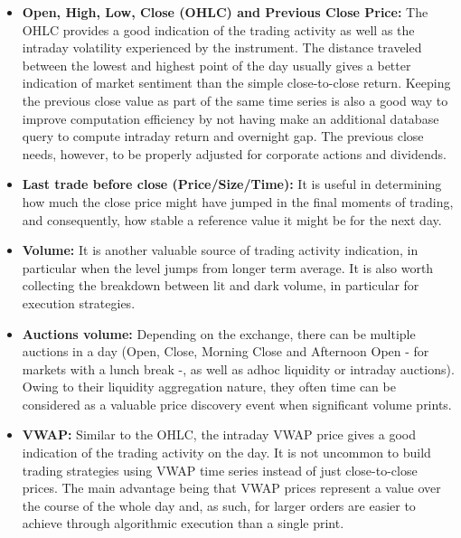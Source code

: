 \begin{itemize}
\item \textbf{Open, High, Low, Close (OHLC) and Previous Close Price:} The OHLC provides a good indication of the trading activity as well as the intraday volatility experienced by the instrument. The distance traveled between the lowest and highest point of the day usually gives a better indication of market sentiment than the simple close-to-close return. Keeping the previous close value as part of the same time series is also a good way to improve computation efficiency by not having make an additional database query to compute intraday return and overnight gap. The previous close needs, however, to be properly adjusted for corporate actions and dividends. 

\item \textbf{Last trade before close (Price/Size/Time):} It is useful in determining how much the close price might have jumped in the final moments of trading, and consequently, how stable a reference value it might be for the next day.

\item \textbf{Volume:} It is another valuable source of trading activity indication, in particular when the level jumps from longer term average. It is also worth collecting the breakdown between lit and dark volume, in particular for execution strategies.

\item \textbf{Auctions volume:} Depending on the exchange, there can be multiple auctions in a day (Open, Close, Morning Close and Afternoon Open - for markets with a lunch break -, as well as adhoc liquidity or intraday auctions). Owing to their liquidity aggregation nature, they often time can be considered as a valuable price discovery event when significant volume prints.

\item \textbf{VWAP:} Similar to the OHLC, the intraday VWAP price gives a good indication of the trading activity on the day. It is not uncommon to build trading strategies using VWAP time series instead of just close-to-close prices. The main advantage being that VWAP prices represent a value over the course of the whole day and, as such, for larger orders are easier to achieve through algorithmic execution than a single print.


\end{itemize}
